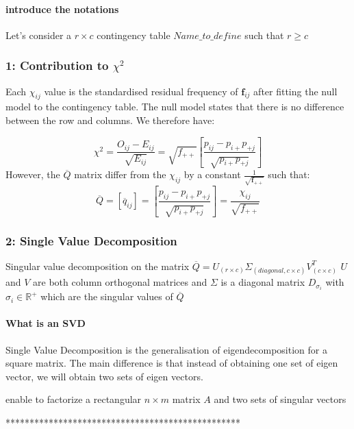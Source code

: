 \documentclass{article}
\begin{document}
\paragraph{introduce the notations}

Let's consider a $r \times c$ contingency table $Name\_to\_define$ such that $r\geq c$ 

\subsubsection{1: Contribution to $\chi^2$}

Each  $\chi_{ij}$ value is the standardised residual frequency of $\textbf{f}_{ij}$ after fitting the null model to the contingency table. The null model states that there is no difference between the row and columns. We therefore have:

$$\chi^2 = \frac{O_{ij} -  E_{ij}}{\sqrt{E_{ij}}} = \sqrt{f_{++}}[\frac{p_{ij} - p_{i+}p_{+j}}{\sqrt{p_{i+}p_{+j}}}]$$
However, the $\overline{Q}$ matrix differ from the $\chi_{ij}$ by a constant $\frac{1}{\sqrt{\textbf{f}_{++}}}$ such that:
$$\overline{Q} = [\overline{q}_{ij}] = [\frac{p_{ij} - p_{i+}p_{+j}}{\sqrt{p_{i+}p_{+j}}}] = \frac{\chi_{ij}}{\sqrt{f_{++}}}$$


\subsubsection{2: Single Value Decomposition}

Singular value decomposition on the matrix $\overline{Q} = U_{(r\times c)} \Sigma_{(diagonal, c\times c)} V_{(c \times c)}^T$ 
$U$ and $V$ are both column orthogonal matrices and $\Sigma$ is a diagonal matrix $D_{\sigma_i}$ with $\sigma_i \in \mathbb{R}^+$ which are the singular values of $\overline{Q}$


\paragraph{What is an SVD}

Single Value Decomposition is the generalisation of eigendecomposition for a square matrix. The main difference is that instead of obtaining one set of eigen vector, we will obtain two sets of eigen vectors.

enable to factorize a  rectangular $n \times m$ matrix $A$ and  
two sets of singular vectors



*************************************************
\end{document}
